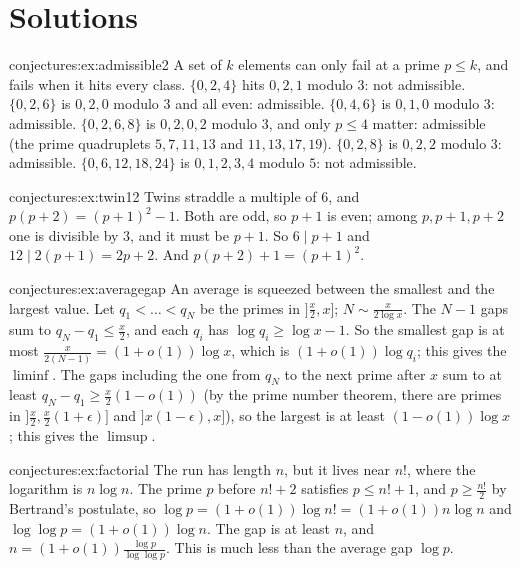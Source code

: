 \section{Solutions}

\begin{solution}{conjectures:ex:admissible2}
\idea A set of $k$ elements can only fail at a prime $p\le k$, and fails when it hits every class.
\writeup $\{0,2,4\}$ hits $0,2,1$ modulo $3$: not admissible. $\{0,2,6\}$ is $0,2,0$ modulo $3$ and all even: admissible. $\{0,4,6\}$ is $0,1,0$ modulo
$3$: admissible. $\{0,2,6,8\}$ is $0,2,0,2$ modulo $3$, and only $p\le4$ matter: admissible (the prime quadruplets $5,7,11,13$ and $11,13,17,19$).
$\{0,2,8\}$ is $0,2,2$ modulo $3$: admissible. $\{0,6,12,18,24\}$ is $0,1,2,3,4$ modulo $5$: not admissible.
\end{solution}

\begin{solution}{conjectures:ex:twin12}
\idea Twins straddle a multiple of $6$, and $p(p+2)=(p+1)^2-1$.
\writeup Both are odd, so $p+1$ is even; among $p,p+1,p+2$ one is divisible by $3$, and it must be $p+1$. So $6\mid p+1$ and $12\mid2(p+1)=2p+2$. And
$p(p+2)+1=(p+1)^2$.
\end{solution}

\begin{solution}{conjectures:ex:averagegap}
\idea An average is squeezed between the smallest and the largest value.
\writeup Let $q_1<\dots<q_N$ be the primes in $]\frac x2,x]$; $N\sim\frac x{2\log x}$. The $N-1$ gaps sum to $q_N-q_1\le\frac x2$, and each $q_i$ has
$\log q_i\ge\log x-1$. So the smallest gap is at most $\frac x{2(N-1)}=(1+o(1))\log x$, which is $(1+o(1))\log q_i$; this gives the $\liminf$. The gaps
including the one from $q_N$ to the next prime after $x$ sum to at least $q_{N}-q_1\ge\frac x2(1-o(1))$ (by the prime number theorem, there are primes
in $]\frac x2,\frac x2(1+\epsilon)]$ and $]x(1-\epsilon),x]$), so the largest is at least $(1-o(1))\log x$; this gives the $\limsup$.
\end{solution}

\begin{solution}{conjectures:ex:factorial}
\idea The run has length $n$, but it lives near $n!$, where the logarithm is $n\log n$.
\writeup The prime $p$ before $n!+2$ satisfies $p\le n!+1$, and $p\ge\frac{n!}2$ by Bertrand's postulate, so $\log p=(1+o(1))\log n!=(1+o(1))n\log n$ and
$\log\log p=(1+o(1))\log n$. The gap is at least $n$, and $n=(1+o(1))\frac{\log p}{\log\log p}$. This is much less than the average gap $\log p$.
\end{solution}


